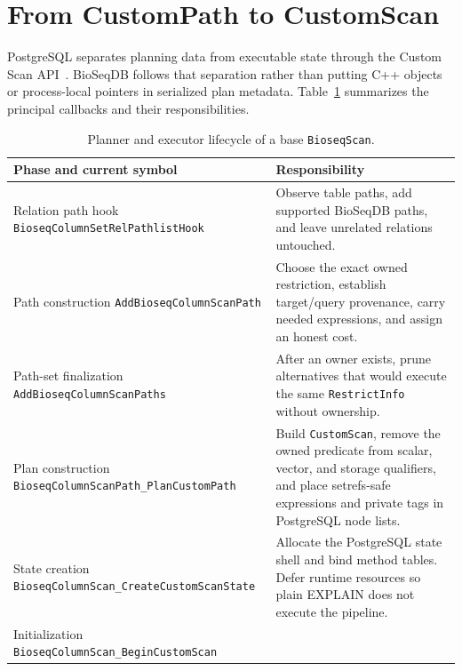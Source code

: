 \section{From CustomPath to CustomScan}
\label{sec:custom-path-plan-lifecycle}

PostgreSQL separates planning data from executable state through the Custom
Scan API~\cite{postgresql17_custom_scan}.  BioSeqDB follows that separation
rather than putting C++ objects or process-local pointers in serialized plan
metadata.  Table~\ref{tab:bioseq-customscan-lifecycle} summarizes the principal
callbacks and their responsibilities.

\begin{table}[htbp]
\centering
\scriptsize
\caption{Planner and executor lifecycle of a base \texttt{BioseqScan}.}
\label{tab:bioseq-customscan-lifecycle}
\begin{tabular}{@{}p{}p{}@{}}
\toprule
Phase and current symbol & Responsibility \\
\midrule
Relation path hook\newline
\texttt{BioseqColumnSet}\allowbreak\texttt{RelPathlistHook} &
Observe table paths, add supported BioSeqDB paths, and leave unrelated
relations untouched. \\
Path construction\newline
\texttt{AddBioseqColumnScanPath} &
Choose the exact owned restriction, establish target/query provenance,
carry needed expressions, and assign an honest cost. \\
Path-set finalization\newline
\texttt{AddBioseqColumnScanPaths} &
After an owner exists, prune alternatives that would execute the same
\texttt{RestrictInfo} without ownership. \\
Plan construction\newline
\texttt{BioseqColumnScanPath\_}\allowbreak\texttt{PlanCustomPath} &
Build \texttt{CustomScan}, remove the owned predicate from scalar,
vector, and storage qualifiers, and place setrefs-safe expressions and
private tags in PostgreSQL node lists. \\
State creation\newline
\texttt{BioseqColumnScan\_}\allowbreak\texttt{CreateCustomScanState} &
Allocate the PostgreSQL state shell and bind method tables.  Defer runtime
resources so plain EXPLAIN does not execute the pipeline. \\
Initialization\newline
\texttt{BioseqColumnScan\_}\allowbreak\texttt{BeginCustomScan} &

\end{tabular}
\end{table}
